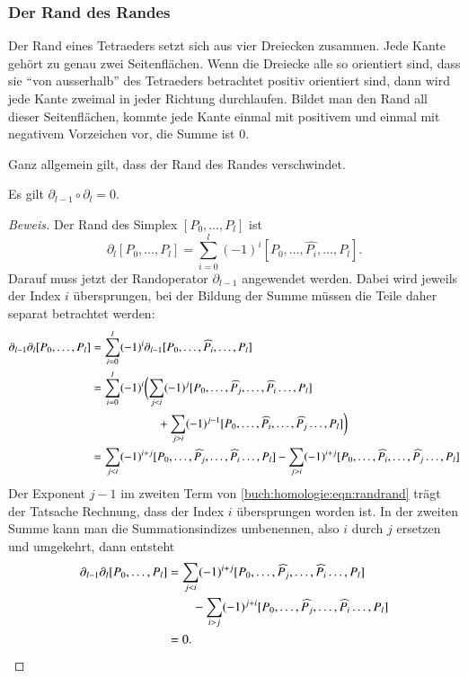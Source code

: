 \subsubsection{Der Rand des Randes}
Der Rand eines Tetraeders setzt sich aus vier Dreiecken
zusammen.
Jede Kante gehört zu genau zwei Seitenflächen. 
Wenn die Dreiecke alle so orientiert sind, dass sie ``von ausserhalb''
des Tetraeders betrachtet positiv orientiert sind, dann wird jede
Kante zweimal in jeder Richtung durchlaufen.
Bildet man den Rand all dieser Seitenflächen, kommte jede Kante
einmal mit positivem und einmal mit negativem Vorzeichen vor,
die Summe ist $0$.

Ganz allgemein gilt, dass der Rand des Randes verschwindet.

\begin{satz}
\label{buch:homologie:satz:randrand}
Es gilt $\partial_{l-1}\circ\partial_l=0$.
\end{satz}

\begin{proof}[Beweis]
Der Rand des Simplex $[P_0,\dots,P_l]$ ist
\[
\partial_l[P_0,\dots,P_l]
=
\sum_{i=0}^l (-1)^i [P_0,\dots,\widehat{P_i},\dots,P_l].
\]
Darauf muss jetzt der Randoperator $\partial_{l-1}$ angewendet
werden.
Dabei wird jeweils der Index $i$ übersprungen, bei der Bildung der
Summe müssen die Teile daher separat betrachtet werden:
\begin{align}
\partial_{l-1}\partial_l[P_0,\dots,P_l]
&=
\sum_{i=0}^l (-1)^i \partial_{l-1}[P_0,\dots,\widehat{P_i},\dots,P_l]
\notag
\\
&=
\sum_{i=0}^l (-1)^i
\biggl(
\sum_{j<i} (-1)^j
[P_0,\dots,\widehat{P_j},\dots,\widehat{P_i}\dots,P_l]
\notag
\\
&\hspace*{2cm}
+
\sum_{j>i} (-1)^{j-1}
[P_0,\dots,\widehat{P_i},\dots,\widehat{P_j}\dots,P_l]
\biggr)
\label{buch:homologie:eqn:randrand}
\\
&=
\sum_{j<i} (-1)^{i+j}
[P_0,\dots,\widehat{P_j},\dots,\widehat{P_i}\dots,P_l]
-
\sum_{j>i} (-1)^{i+j}
[P_0,\dots,\widehat{P_i},\dots,\widehat{P_j}\dots,P_l]
\notag
\end{align}
Der Exponent $j-1$ im zweiten Term von
\eqref{buch:homologie:eqn:randrand}
trägt der Tatsache Rechnung,
dass der Index $i$ übersprungen worden ist.
In der zweiten Summe kann man die Summationsindizes umbenennen,
also $i$ durch $j$ ersetzen und umgekehrt, dann entsteht
\begin{align*}
\partial_{l-1}\partial_l[P_0,\dots,P_l]
&=
\sum_{j<i} (-1)^{i+j}
[P_0,\dots,\widehat{P_j},\dots,\widehat{P_i}\dots,P_l]
\\
&\qquad
-
\sum_{i>j} (-1)^{j+i}
[P_0,\dots,\widehat{P_j},\dots,\widehat{P_i}\dots,P_l]
\\
&=0.
\qedhere
\end{align*}
\end{proof}

